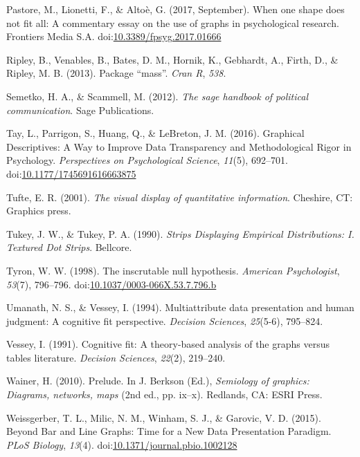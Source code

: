 \documentclass[
  doc]{apa6}
\begin{document}
\leavevmode\hypertarget{ref-Pastore2017}{}%
Pastore, M., Lionetti, F., \& Altoè, G. (2017, September). When one shape does not fit all: A commentary essay on the use of graphs in psychological research. Frontiers Media S.A. doi:\href{https://doi.org/10.3389/fpsyg.2017.01666}{10.3389/fpsyg.2017.01666}

\leavevmode\hypertarget{ref-ripley2013package}{}%
Ripley, B., Venables, B., Bates, D. M., Hornik, K., Gebhardt, A., Firth, D., \& Ripley, M. B. (2013). Package ``mass''. \emph{Cran R}, \emph{538}.

\leavevmode\hypertarget{ref-semetko2012sage}{}%
Semetko, H. A., \& Scammell, M. (2012). \emph{The sage handbook of political communication}. Sage Publications.

\leavevmode\hypertarget{ref-Tay2016a}{}%
Tay, L., Parrigon, S., Huang, Q., \& LeBreton, J. M. (2016). Graphical Descriptives: A Way to Improve Data Transparency and Methodological Rigor in Psychology. \emph{Perspectives on Psychological Science}, \emph{11}(5), 692--701. doi:\href{https://doi.org/10.1177/1745691616663875}{10.1177/1745691616663875}

\leavevmode\hypertarget{ref-Tufte2001}{}%
Tufte, E. R. (2001). \emph{The visual display of quantitative information}. Cheshire, CT: Graphics press.

\leavevmode\hypertarget{ref-Tukey1990}{}%
Tukey, J. W., \& Tukey, P. A. (1990). \emph{Strips Displaying Empirical Distributions: I. Textured Dot Strips}. Bellcore.

\leavevmode\hypertarget{ref-Tyron1998}{}%
Tyron, W. W. (1998). The inscrutable null hypothesis. \emph{American Psychologist}, \emph{53}(7), 796--796. doi:\href{https://doi.org/10.1037/0003-066X.53.7.796.b}{10.1037/0003-066X.53.7.796.b}

\leavevmode\hypertarget{ref-umanath1994multiattribute}{}%
Umanath, N. S., \& Vessey, I. (1994). Multiattribute data presentation and human judgment: A cognitive fit perspective. \emph{Decision Sciences}, \emph{25}(5-6), 795--824.

\leavevmode\hypertarget{ref-vessey1991cognitive}{}%
Vessey, I. (1991). Cognitive fit: A theory-based analysis of the graphs versus tables literature. \emph{Decision Sciences}, \emph{22}(2), 219--240.

\leavevmode\hypertarget{ref-Wainer2010}{}%
Wainer, H. (2010). Prelude. In J. Berkson (Ed.), \emph{Semiology of graphics: Diagrams, networks, maps} (2nd ed., pp. ix--x). Redlands, CA: ESRI Press.

\leavevmode\hypertarget{ref-Weissgerber2015}{}%
Weissgerber, T. L., Milic, N. M., Winham, S. J., \& Garovic, V. D. (2015). Beyond Bar and Line Graphs: Time for a New Data Presentation Paradigm. \emph{PLoS Biology}, \emph{13}(4). doi:\href{https://doi.org/10.1371/journal.pbio.1002128}{10.1371/journal.pbio.1002128}
\end{document}
